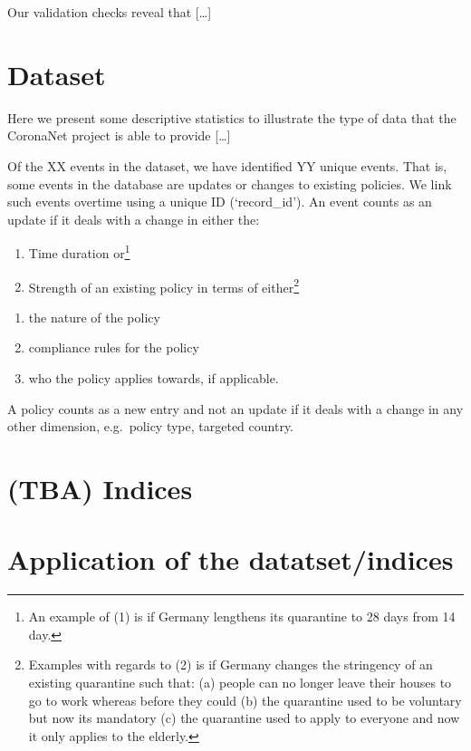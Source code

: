 \documentclass[
]{article}
\providecommand{\tightlist}{%
  \setlength{\itemsep}{0pt}\setlength{\parskip}{0pt}}
\begin{document}
Our validation checks reveal that {[}\ldots{]}

\hypertarget{dataset}{%
\section{Dataset}\label{dataset}}

Here we present some descriptive statistics to illustrate the type of data that the CoronaNet project is able to provide {[}\ldots{]}

Of the XX events in the dataset, we have identified YY unique events. That is, some events in the database are updates or changes to existing policies. We link such events overtime using a unique ID (`record\_id'). An event counts as an update if it deals with a change in either the:

\begin{enumerate}
\def\labelenumi{(\arabic{enumi})}
\tightlist
\item
  Time duration or\footnote{An example of (1) is if Germany lengthens its quarantine to 28 days from 14 day.}
\item
  Strength of an existing policy in terms of either\footnote{Examples with regards to (2) is if Germany changes the stringency of an existing quarantine such that: (a) people can no longer leave their houses to go to work whereas before they could (b) the quarantine used to be voluntary but now its mandatory (c) the quarantine used to apply to everyone and now it only applies to the elderly.}
\end{enumerate}

\begin{enumerate}
\def\labelenumi{(\alph{enumi})}
\tightlist
\item
  the nature of the policy
\item
  compliance rules for the policy
\item
  who the policy applies towards, if applicable.
\end{enumerate}

A policy counts as a new entry and not an update if it deals with a change in any other dimension, e.g.~policy type, targeted country.

\hypertarget{tba-indices}{%
\section{(TBA) Indices}\label{tba-indices}}

\hypertarget{application-of-the-datatsetindices}{%
\section{Application of the datatset/indices}\label{application-of-the-datatsetindices}}
\end{document}
